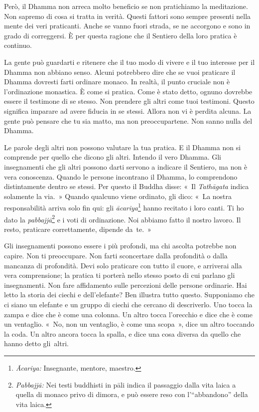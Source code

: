 Però, il Dhamma non arreca molto beneficio se non pratichiamo la
meditazione. Non sapremo di cosa si tratta in verità. Questi fattori
sono sempre presenti nella mente dei veri praticanti. Anche se vanno
fuori strada, se ne accorgono e sono in grado di correggersi. È per
questa ragione che il Sentiero della loro pratica è continuo.

La gente può guardarti e ritenere che il tuo modo di vivere e il tuo
interesse per il Dhamma non abbiano senso. Alcuni potrebbero dire che se
vuoi praticare il Dhamma dovresti farti ordinare monaco. In realtà, il
punto cruciale non è l'ordinazione monastica. È come si pratica. Come è
stato detto, ognuno dovrebbe essere il testimone di se stesso. Non
prendere gli altri come tuoi testimoni. Questo significa imparare ad
avere fiducia in se stessi. Allora non vi è perdita alcuna. La gente può
pensare che tu sia matto, ma non preoccupartene. Non sanno nulla del
Dhamma.

Le parole degli altri non possono valutare la tua pratica. E il Dhamma
non si comprende per quello che dicono gli altri. Intendo il vero
Dhamma. Gli insegnamenti che gli altri possono darti servono a indicare
il Sentiero, ma non è vera conoscenza. Quando le persone incontrano il
Dhamma, lo comprendono distintamente dentro se stessi. Per questo il
Buddha disse: «~Il \emph{Tathāgata} indica solamente la via.~» Quando
qualcuno viene ordinato, gli dico: «~La nostra responsabilità arriva
solo fin qui: gli \emph{ācariya}\footnote{\emph{Ācariya:} Insegnante,
  mentore, maestro.} hanno recitato i loro canti. Ti ho dato la
\emph{pabbajjā}\footnote{\emph{Pabbajjā:} Nei testi
  buddhisti in pāli indica il passaggio dalla vita laica a quella di
  monaco privo di dimora, e può essere reso con l'``abbandono'' della
  vita laica.} e i voti di ordinazione. Noi abbiamo fatto il nostro
lavoro. Il resto, praticare correttamente, dipende da~te.~»

Gli insegnamenti possono essere i più profondi, ma chi ascolta potrebbe
non capire. Non ti preoccupare. Non farti sconcertare dalla profondità o
dalla mancanza di profondità. Devi solo praticare con tutto il cuore, e
arriverai alla vera comprensione; la pratica ti porterà nello stesso
posto di cui parlano gli insegnamenti. Non fare affidamento sulle
percezioni delle persone ordinarie. Hai letto la storia dei ciechi e
dell'elefante? Ben illustra tutto questo. Supponiamo che ci siano un
elefante e un gruppo di ciechi che cercano di descriverlo. Uno tocca la
zampa e dice che è come una colonna. Un altro tocca l'orecchio e dice
che è come un ventaglio. «~No, non un ventaglio, è come una scopa~»,
dice un altro toccando la coda. Un altro ancora tocca la spalla, e dice
una cosa diversa da quello che hanno detto gli~altri.

